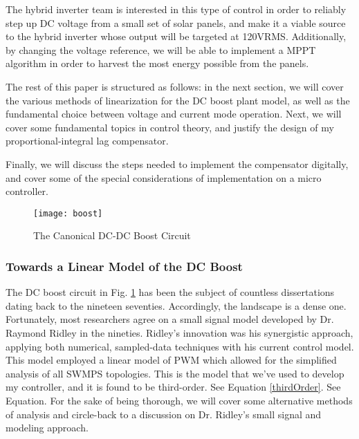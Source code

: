 The hybrid inverter team is interested in this type of control in order to reliably step up DC voltage from a small set of solar panels, and make it a viable source to the hybrid inverter whose output will be targeted at 120VRMS.
Additionally, by changing the voltage reference, we will be able to implement a MPPT algorithm in order to harvest the most energy possible from the panels.

The rest of this paper is structured as follows: in the next section, we will cover the various methods of linearization for the DC boost plant model, as well as the fundamental choice between voltage and current mode operation. Next, we will cover some fundamental topics in control theory, and justify the design of my proportional-integral lag compensator. 

Finally, we will discuss the steps needed to implement the compensator digitally, and cover some of the special considerations of implementation on a micro controller.  

\begin{figure}[htbp]
\begin{center}
\texttt{[image: boost]}
\caption{The Canonical DC-DC Boost Circuit}
\label{boost}
\end{center}
\end{figure}


\subsubsection{Towards a Linear Model of the DC Boost}

The DC boost circuit in Fig. \ref{boost} has been the subject of countless dissertations dating back to the nineteen seventies. Accordingly, the landscape is a dense one. Fortunately, most researchers agree on a small signal model developed by Dr. Raymond Ridley in the nineties. Ridley's innovation was his synergistic approach, applying both numerical, sampled-data techniques with his current control model. This model employed a linear model of PWM which allowed for the simplified analysis of all SWMPS topologies. This is the model that we've used to develop my controller, and it is found to be third-order. See Equation \ref{thirdOrder}. See Equation. For the sake of being thorough, we will cover some alternative methods of analysis and circle-back to a discussion on Dr. Ridley's small signal and modeling approach.

